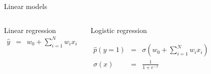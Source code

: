 \documentclass{beamer}
\begin{document}
\begin{frame}{Linear models}

\begin{columns}[t]

\begin{block}{Linear regression}
\begin{eqnarray*}
\hat{y} &=& w_0 + \sum_{i=1}^N w_i x_i
\end{eqnarray*}
\end{block}	
	

\begin{block}{Logistic regression}

\begin{eqnarray*}
\hat{p}\left(y = 1\right) &=& \sigma\left(w_0 + \sum_{i=1}^N w_i x_i\right) \\
\sigma\left(x\right) &=& \frac{1}{1 + e^{-x}}
\end{eqnarray*}
\end{block}
	
\end{columns}

\end{frame}
\end{document}
